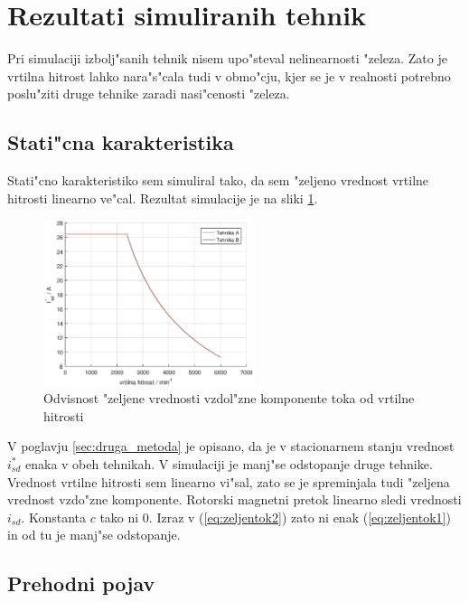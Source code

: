 \documentclass[journal,a4paper,twoside]{sty/IEEEtran}
\begin{document}
\section{Rezultati simuliranih tehnik}

Pri simulaciji izbolj"sanih tehnik nisem upo"steval nelinearnosti "zeleza. Zato je vrtilna hitrost lahko nara"s"cala tudi v obmo"cju, kjer se je v realnosti potrebno poslu"ziti druge tehnike zaradi nasi"cenosti "zeleza.

\subsection{Stati"cna karakteristika}

Stati"cno karakteristiko sem simuliral tako, da sem "zeljeno vrednost vrtilne hitrosti linearno ve"cal. Rezultat simulacije je na sliki \ref{fig:static}.

\begin{figure}
\includegraphics[width=0.55\textwidth]{fig_static.eps}
\caption{Odvisnost "zeljene vrednosti vzdol"zne komponente toka od vrtilne hitrosti}
\label{fig:static}
\end{figure}

V poglavju \ref{sec:druga_metoda} je opisano, da je v stacionarnem stanju vrednost $i_{sd}^*$ enaka v obeh tehnikah. V simulaciji je manj"se odstopanje druge tehnike. Vrednost vrtilne hitrosti sem linearno vi"sal, zato se je spreminjala tudi "zeljena vrednost vzdo"zne komponente. Rotorski magnetni pretok  linearno sledi vrednosti $i_{sd}$. Konstanta $c$ tako ni 0. Izraz v (\ref{eq:zeljentok2}) zato ni enak (\ref{eq:zeljentok1}) in od tu je manj"se odstopanje.

\subsection{Prehodni pojav}
\end{document}
